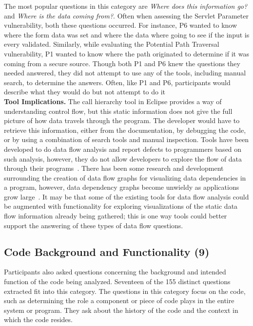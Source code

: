 \documentclass[conference]{IEEEtran}
\begin{document}
The most popular questions in this category are \textit{Where does this information go?} and \textit{Where is the data coming from?}. 
Often when assessing the Servlet Parameter vulnerability, both these questions occurred. 
For instance, P6 wanted to know where the form data was set and where the data where going to see if the input is every validated.  
Similarly, while evaluating the Potential Path Traversal vulnerability, P1 wanted to know where the path originated to determine if it was coming from a secure source.
Though both P1 and P6 knew the questions they needed answered, they did not attempt to use any of the tools, including manual search, to determine the answers. %
Often, like P1 and P6, participants would describe what they would do but not attempt to do it
\\

\noindent\textbf{Tool Implications.}
The call hierarchy tool in Eclipse provides a way of understanding control flow, but this static information does not give the full picture of how data travels through the program. 
The developer would have to retrieve this information, either from the documentation, by debugging the code, or by using a combination of search tools and manual inspection. 
Tools have been developed to do data flow analysis and report defects to programmers based on such analysis, however, they do not allow developers to explore the flow of data through their programs~\cite{jovanovic2006pixy}. 
There has been some research and development surrounding the creation of data flow graphs for visualizing data dependencies in a program, however, data dependency graphs become unwieldy as applications grow large~\cite{ghosh2001method, ferrante1987program}. 
It may be that some of the existing tools for data flow analysis could be augmented with functionality for exploring visualizations of the static data flow information already being gathered; this is one way tools could better support the answering of these types of data flow questions.




\noindent\subsection{\textbf{Code Background and Functionality (9)}}
\label{cbf}
Participants also asked questions concerning the background and intended function of the code being analyzed. 
Seventeen of the 155 distinct questions extracted fit into this category. 
The questions in this category focus on the code, such as determining the role a component or piece of code plays in the entire system or program.
They ask about the history of the code and the context in which the code resides.
\\
\end{document}
